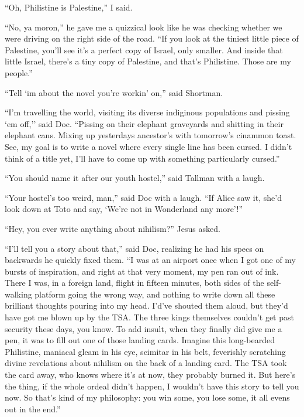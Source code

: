 \documentclass[oneside]{book}
\begin{document}
``Oh, Philistine is Palestine,'' I said.

``No, ya moron,'' he gave me a quizzical look like he was checking whether
we were driving on the right side of the road.
``If you look at the tiniest little piece of Palestine, you'll see it's a
perfect copy of Israel, only smaller.  And inside that little Israel, there's
a tiny copy of Palestine, and that's Philistine.  Those are my people.''

``Tell `im about the novel you're workin' on,'' said Shortman.

``I'm travelling the world, visiting its diverse indiginous populations
and pissing `em off,'' said Doc.  ``Pissing on their elephant graveyards
and shitting in their elephant cans.  Mixing up yesterdays ancestor's with
tomorrow's cinammon toast.  See, my goal is to write a novel where every
single line has been cursed.  I didn't think of a title yet, I'll have
to come up with something particularly cursed.''

``You should name it after our youth hostel,'' said Tallman with a laugh.

``Your hostel's too weird, man,'' said Doc with a laugh.  ``If Alice saw it,
she'd look down at Toto and say, `We're not in Wonderland any more'!''

``Hey, you ever write anything about nihilism?'' Jesus asked.

``I'll tell you a story about that,'' said Doc, realizing he had his
specs on backwards he quickly fixed them.  ``I was at an airport once when I got
one of my bursts of inspiration, and right at that very moment, my pen ran out
of ink.  There I was, in a foreign land, flight in fifteen minutes, both sides of
the self-walking platform going the wrong way, and nothing to write down all these
brilliant thoughts pouring into my head.  I'd've shouted them aloud, but they'd have
got me blown up by the TSA.  The three kings themselves couldn't get past security
these days, you know.  To add insult, when they finally did give me a pen, it was to
fill out one of those landing cards.  Imagine this long-bearded Philistine, maniacal
gleam in his eye, scimitar in his belt, feverishly scratching divine revelations about
nihilism on the back of a landing card.  The TSA took the card away, who knows where
it's at now, they probably burned it.  But here's the thing, if the whole ordeal didn't
happen, I wouldn't have this story to tell you now.  So that's kind of my philosophy:
you win some, you lose some, it all evens out in the end.''
\end{document}
